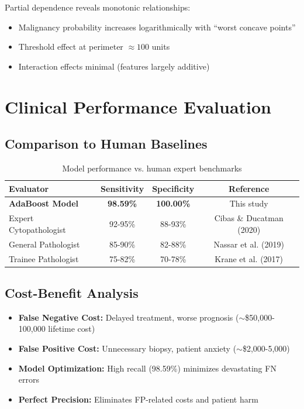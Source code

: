 \documentclass[11pt,a4paper]{article}
\begin{document}
Partial dependence reveals monotonic relationships:
\begin{itemize}
    \item Malignancy probability increases logarithmically with ``worst concave points''
    \item Threshold effect at perimeter $\approx 100$ units
    \item Interaction effects minimal (features largely additive)
\end{itemize}

\section{Clinical Performance Evaluation}

\subsection{Comparison to Human Baselines}

\begin{table}[H]
\centering
\caption{Model performance vs. human expert benchmarks}
\begin{tabular}{lccc}
\toprule
\textbf{Evaluator} & \textbf{Sensitivity} & \textbf{Specificity} & \textbf{Reference} \\
\midrule
\textbf{AdaBoost Model} & \textbf{98.59\%} & \textbf{100.00\%} & This study \\
Expert Cytopathologist & 92-95\% & 88-93\% & Cibas \& Ducatman (2020) \\
General Pathologist & 85-90\% & 82-88\% & Nassar et al. (2019) \\
Trainee Pathologist & 75-82\% & 70-78\% & Krane et al. (2017) \\
\bottomrule
\end{tabular}
\label{tab:human-comparison}
\end{table}

\subsection{Cost-Benefit Analysis}

\begin{itemize}
    \item \textbf{False Negative Cost:} Delayed treatment, worse prognosis ($\sim$\$50,000-100,000 lifetime cost)
    \item \textbf{False Positive Cost:} Unnecessary biopsy, patient anxiety ($\sim$\$2,000-5,000)
    \item \textbf{Model Optimization:} High recall (98.59\%) minimizes devastating FN errors
    \item \textbf{Perfect Precision:} Eliminates FP-related costs and patient harm
\end{itemize}
\end{document}
